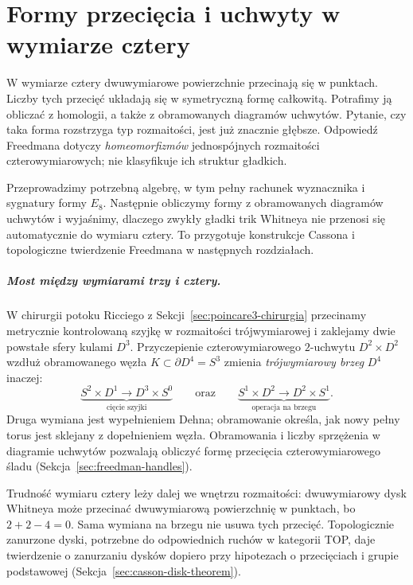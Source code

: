 \chapter{Formy przecięcia i uchwyty w wymiarze cztery}
\label{ch:freedman-formy}

W wymiarze cztery dwuwymiarowe powierzchnie przecinają
się w punktach. Liczby tych przecięć układają się w
symetryczną formę całkowitą. Potrafimy ją obliczać z
homologii, a także z obramowanych diagramów uchwytów.
Pytanie, czy taka forma rozstrzyga typ rozmaitości, jest
już znacznie głębsze. Odpowiedź Freedmana dotyczy
\emph{homeomorfizmów} jednospójnych rozmaitości
czterowymiarowych; nie klasyfikuje ich struktur gładkich.

Przeprowadzimy potrzebną algebrę, w tym pełny rachunek
wyznacznika i sygnatury formy $E_8$. Następnie
obliczymy formy z obramowanych diagramów uchwytów
i wyjaśnimy, dlaczego zwykły gładki trik Whitneya
nie przenosi się automatycznie do wymiaru cztery.
To przygotuje konstrukcje Cassona i topologiczne
twierdzenie Freedmana w następnych rozdziałach.

\paragraph{Most między wymiarami trzy i cztery.}
\label{par:freedman-bridge-3-4}
W chirurgii potoku Ricciego z
Sekcji~\ref{sec:poincare3-chirurgia} przecinamy metrycznie
kontrolowaną szyjkę w rozmaitości trójwymiarowej i
zaklejamy dwie powstałe sfery kulami $D^3$.
Przyczepienie czterowymiarowego $2$-uchwytu
$D^2\times D^2$ wzdłuż obramowanego węzła
$K\subset\partial D^4=S^3$ zmienia
\emph{trójwymiarowy brzeg} $D^4$ inaczej:
\[
 \underbrace{S^2\times D^1\longrightarrow D^3\times S^0}
 _{\text{cięcie szyjki}}
 \qquad\text{oraz}\qquad
 \underbrace{S^1\times D^2\longrightarrow D^2\times S^1}
 _{\text{operacja na brzegu}}.
\]
Druga wymiana jest wypełnieniem Dehna; obramowanie
określa, jak nowy pełny torus jest sklejany z dopełnieniem
węzła. Obramowania i liczby sprzężenia w diagramie
uchwytów pozwalają obliczyć formę przecięcia
czterowymiarowego śladu
(Sekcja~\ref{sec:freedman-handles}).

Trudność wymiaru cztery leży dalej we wnętrzu
rozmaitości: dwuwymiarowy dysk Whitneya może
przecinać dwuwymiarową powierzchnię w punktach,
bo $2+2-4=0$. Sama wymiana na brzegu nie usuwa
tych przecięć. Topologicznie zanurzone dyski, potrzebne
do odpowiednich ruchów w kategorii TOP, daje
twierdzenie o zanurzaniu dysków dopiero przy hipotezach
o przecięciach i grupie podstawowej
(Sekcja~\ref{sec:casson-disk-theorem}).

